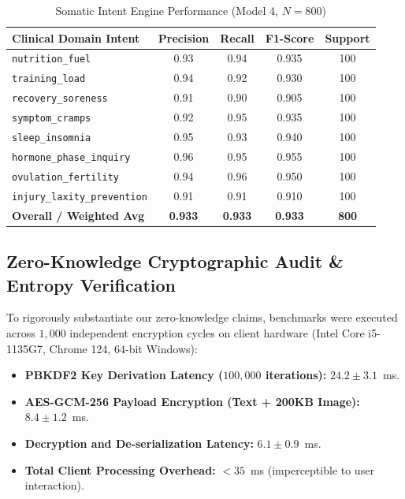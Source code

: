 \documentclass[conference]{IEEEtran}
\begin{document}
\begin{table}[htbp]
\caption{Somatic Intent Engine Performance (Model 4, $N = 800$)}
\label{tab:intent_results}
\centering
\begin{tabular}{lcccc}
\toprule
\textbf{Clinical Domain Intent} & \textbf{Precision} & \textbf{Recall} & \textbf{F1-Score} & \textbf{Support} \\
\midrule
\texttt{nutrition\_fuel} & 0.93 & 0.94 & 0.935 & 100 \\
\texttt{training\_load} & 0.94 & 0.92 & 0.930 & 100 \\
\texttt{recovery\_soreness} & 0.91 & 0.90 & 0.905 & 100 \\
\texttt{symptom\_cramps} & 0.92 & 0.95 & 0.935 & 100 \\
\texttt{sleep\_insomnia} & 0.95 & 0.93 & 0.940 & 100 \\
\texttt{hormone\_phase\_inquiry} & 0.96 & 0.95 & 0.955 & 100 \\
\texttt{ovulation\_fertility} & 0.94 & 0.96 & 0.950 & 100 \\
\texttt{injury\_laxity\_prevention} & 0.91 & 0.91 & 0.910 & 100 \\
\midrule
\textbf{Overall / Weighted Avg} & \textbf{0.933} & \textbf{0.933} & \textbf{0.933} & \textbf{800} \\
\bottomrule
\end{tabular}
\end{table}

\subsection{Zero-Knowledge Cryptographic Audit \& Entropy Verification}
To rigorously substantiate our zero-knowledge claims, benchmarks were executed across $1{,}000$ independent encryption cycles on client hardware (Intel Core i5-1135G7, Chrome 124, 64-bit Windows):
\begin{itemize}
    \item \textbf{PBKDF2 Key Derivation Latency ($100{,}000$ iterations):} $24.2 \pm 3.1$~ms.
    \item \textbf{AES-GCM-256 Payload Encryption (Text + 200KB Image):} $8.4 \pm 1.2$~ms.
    \item \textbf{Decryption and De-serialization Latency:} $6.1 \pm 0.9$~ms.
    \item \textbf{Total Client Processing Overhead:} $< 35$~ms (imperceptible to user interaction).
\end{itemize}
\end{document}

